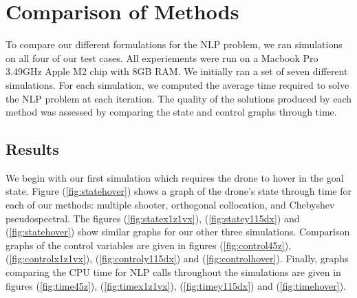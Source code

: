 \documentclass[]{article}
\begin{document}
\section*{Comparison of Methods}

To compare our different formulations for the NLP problem, we ran simulations on all four of our test cases.  All experiements were run on a Macbook Pro  3.49GHz Apple M2 chip with 8GB RAM. We initially ran a set of seven different simulations.  For each simulation, we computed the average time required to solve the NLP problem at each iteration. The quality of the solutions produced by each method was assessed by comparing the state and control graphs through time. 


\subsection*{Results}
We begin with our first simulation which requires the drone to hover in the goal state. 
Figure (\ref{fig:statehover}) shows a graph of the drone's state through time for each of our methods:  multiple shooter, orthogonal collocation, and Chebyshev pseudospectral. The figures  (\ref{fig:statex1z1vx}), (\ref{fig:statey115dx}) and (\ref{fig:statehover}) show similar graphs for our other three simulations.  Comparison graphs of the control variables are given in figures (\ref{fig:control45z}), (\ref{fig:controlx1z1vx}), (\ref{fig:controly115dx}) and (\ref{fig:controlhover}). Finally, graphs comparing the CPU time for NLP calls throughout the simulations are given in figures (\ref{fig:time45z}), (\ref{fig:timex1z1vx}), (\ref{fig:timey115dx}) and (\ref{fig:timehover}). 
 
\end{document}
